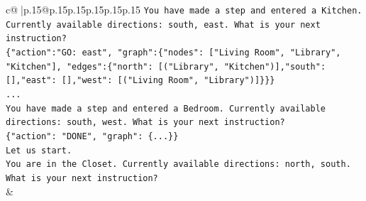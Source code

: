 \documentclass{article}
\begin{document}
{\begin{supertabular}{c@{$\;$}|p{.15\linewidth}@{}p{.15\linewidth}p{.15\linewidth}p{.15\linewidth}p{.15\linewidth}p{.15\linewidth}}
{{{\texttt{You have made a step and entered a Kitchen. Currently available directions: south, east. What is your next instruction?} \\
\texttt{\{"action":"GO: east", "graph":\{"nodes": {[}"Living Room", "Library", "Kitchen"{]}, "edges":\{"north": {[}("Library", "Kitchen"){]},"south": {[}{]},"east": {[}{]},"west": {[}("Living Room", "Library"){]}\}\}\}} \\
\texttt{...} \\
\texttt{You have made a step and entered a Bedroom. Currently available directions: south, west. What is your next instruction?} \\
\texttt{\{"action": "DONE", "graph": \{...\}\}} \\
\texttt{Let us start.} \\
\texttt{You are in the Closet. Currently available directions: north, south. What is your next instruction?} \\
            }
        }
    }
    & \\ \\


\end{supertabular}}
\end{document}
